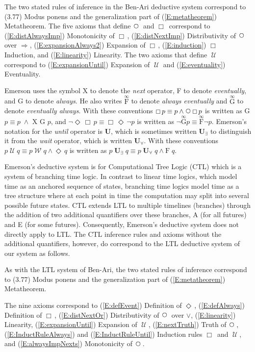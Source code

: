\documentclass[12pt, fleqn, leqno]{article}
\newcommand{\impl}{\ensuremath{\Rightarrow}}        %
\newcommand{\Until}{\;\mathcal{U}\;}
\newcommand{\Wait}{\;\mathcal{W}\;}
\newcommand{\Next}{\;\,\text{\raisebox{3.5pt}{\circle{6}}}}
\newcommand{\Event}{\Diamond\,}
\newcommand{\Always}{\Box\,}
\newcommand{\all}{\forall}                          %
\newcommand{\ext}{\exists}                          %
\begin{document}
The two stated rules of inference in the Ben-Ari deductive system correspond to (3.77) Modus ponens and the generalization part of (\ref{E:metatheorem}) Metatheorem.
The five axioms that define $\Next$ and $\Always$ correspond to (\ref{E:distAlwaysImp}) Monotonicity of $\Always$, (\ref{E:distNextImp}) Distributivity of $\Next$ over $\impl$, (\ref{E:expansionAlways2}) Expansion of $\Always$, (\ref{E:induction}) $\Always$ Induction, and (\ref{E:linearity}) Linearity.
The two axioms that define $\Until$ correspond to (\ref{E:expansionUntil}) Expansion of $\Until$ and (\ref{E:eventuality}) Eventuality.

Emerson \cite{Emer} uses the symbol X to denote the \textit{next} operator, F to denote \textit{eventually}, and G to denote \textit{always}.
He also writes $\overset{\infty}{\textrm{F}}$ to denote \textit{always eventually} and $\overset{\infty}{\textrm{G}}$ to denote \textit{eventually always}.
With these conventions $\Always p \equiv p \land \Next\Always p$ is written as G $p \equiv p \;\land$ X G $p$, and $\neg \Event\Always p \equiv \Always\Event \neg p$ is written as $\neg \overset{\infty}{\textrm{G}} p \equiv \overset{\infty}{\textrm{F}} \neg p$.
Emerson's notation for the \textit{until} operator is $\mathbf{U}$, which is sometimes written $\mathbf{U}_\ext$ to distinguish it from the \textit{wait} operator, which is written $\mathbf{U}_\all$.
With these conventions $p \Until q \equiv p \Wait q\land \Event q$ is written as $p \;\mathbf{U}_\ext \;q \equiv p \;\mathbf{U}_\all \;q\land \textrm{F} \;q$.

Emerson's deductive system is for Computational Tree Logic (CTL) which is a system of branching time logic.
In contrast to linear time logics, which model time as an anchored sequence of states, branching time logics model time as a tree structure where at each point in time the computation may split into several possible future states.
CTL extends LTL to multiple timelines (branches) through the addition of two additional quantifiers over these branches, A (for all futures) and E (for some futures).
Consequently, Emerson's deductive system does not directly apply to LTL.
The CTL inference rules and axioms without the additional quantifiers, however, do correspond to the LTL deductive system of our system as follows. 

As with the LTL system of Ben-Ari, the two stated rules of inference correspond to (3.77) Modus ponens and the generalization part of (\ref{E:metatheorem}) Metatheorem.

The nine axioms correspond to (\ref{E:defEvent}) Definition of $\Event$, (\ref{E:defAlways}) Definition of $\Always$, (\ref{E:distNextOr}) Distributivity of $\Next$ over $\lor$, (\ref{E:linearity}) Linearity, (\ref{E:expansionUntil}) Expansion of $\Until$, (\ref{E:nextTruth}) Truth of $\Next$, (\ref{E:InductRuleAlways}) and (\ref{E:InductRuleUntil}) Induction rules $\Always$ and $\Until$, and (\ref{E:alwaysImpNexts}) Monotonicity of $\Next$.
\end{document}
